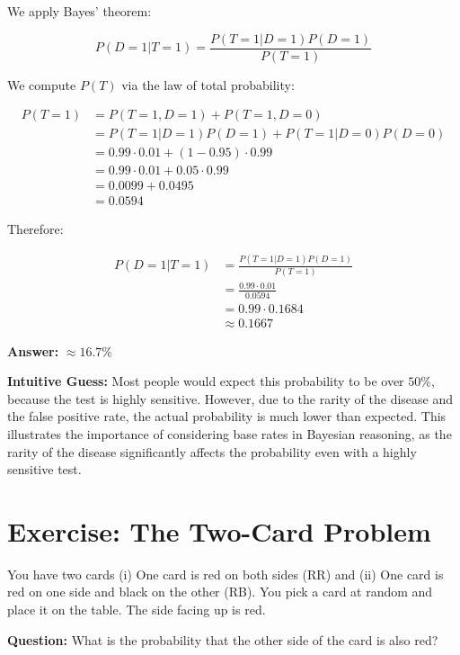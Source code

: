 \documentclass[11pt]{article}
\begin{document}
We apply Bayes’ theorem:

\[
P(D = 1 | T = 1) = \frac{P(T = 1 | D = 1) P(D = 1)}{P(T = 1)}
\]

We compute $P(T)$ via the law of total probability:

\begin{align*}
  P(T = 1) &= P(T = 1, D = 1) + P(T = 1, D = 0) \\
           &= P(T = 1 | D = 1) P(D = 1) + P(T = 1 | D = 0) P(D = 0) \\
           &= 0.99 \cdot 0.01 + (1 - 0.95) \cdot 0.99 \\
           &= 0.99 \cdot 0.01 + 0.05 \cdot 0.99 \\
           &= 0.0099 + 0.0495 \\
           &= 0.0594
\end{align*}

Therefore:

\begin{align*}
  P(D = 1 | T = 1) &= \frac{P(T = 1 | D = 1) P(D = 1)}{P(T = 1)} \\
                   &= \frac{0.99 \cdot 0.01}{0.0594} \\
                   &= 0.99 \cdot 0.1684 \\
                   &\approx 0.1667
\end{align*}

\noindent
\textbf{Answer:} $\boxed{\approx 16.7\%}$

\noindent
\textbf{Intuitive Guess:} Most people would expect this probability to be over $50\%$, because the test is highly sensitive. However, due to the rarity of the disease and the false positive rate, the actual probability is much lower than expected.
This illustrates the importance of considering base rates in Bayesian reasoning, as the rarity of the disease significantly affects the probability even with a highly sensitive test.
\fi

\section{Exercise: The Two-Card Problem}

You have two cards (i) One card is red on both sides (RR) and (ii) One card is red on one side and black on the other (RB).
You pick a card at random and place it on the table. The side facing up is red.

\noindent
\textbf{Question:} What is the probability that the other side of the card is also red?
\end{document}
